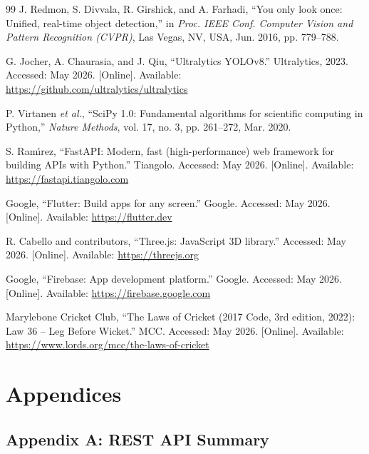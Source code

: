 \documentclass[12pt,a4paper]{report}
\begin{document}
\begin{thebibliography}{99}
 J. Redmon, S. Divvala, R. Girshick, and A. Farhadi, ``You only look once: Unified, real-time object detection,'' in \textit{Proc. IEEE Conf. Computer Vision and Pattern Recognition (CVPR)}, Las Vegas, NV, USA, Jun. 2016, pp. 779--788.

 G. Jocher, A. Chaurasia, and J. Qiu, ``Ultralytics YOLOv8.'' Ultralytics, 2023. Accessed: May 2026. [Online]. Available: \url{https://github.com/ultralytics/ultralytics}

 P. Virtanen \textit{et al.}, ``SciPy 1.0: Fundamental algorithms for scientific computing in Python,'' \textit{Nature Methods}, vol. 17, no. 3, pp. 261--272, Mar. 2020.

 S. Ram\'{\i}rez, ``FastAPI: Modern, fast (high-performance) web framework for building APIs with Python.'' Tiangolo. Accessed: May 2026. [Online]. Available: \url{https://fastapi.tiangolo.com}

 Google, ``Flutter: Build apps for any screen.'' Google. Accessed: May 2026. [Online]. Available: \url{https://flutter.dev}

 R. Cabello and contributors, ``Three.js: JavaScript 3D library.'' Accessed: May 2026. [Online]. Available: \url{https://threejs.org}

 Google, ``Firebase: App development platform.'' Google. Accessed: May 2026. [Online]. Available: \url{https://firebase.google.com}

 Marylebone Cricket Club, ``The Laws of Cricket (2017 Code, 3rd edition, 2022): Law 36 -- Leg Before Wicket.'' MCC. Accessed: May 2026. [Online]. Available: \url{https://www.lords.org/mcc/the-laws-of-cricket}

\end{thebibliography}

\clearpage
\chapter*{Appendices}

\section*{Appendix A: REST API Summary}
\end{document}
